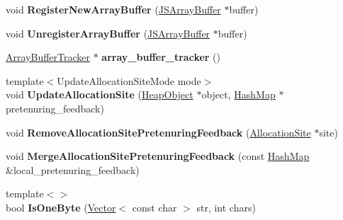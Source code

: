 \begin{DoxyCompactItemize}
\item 
void {\bfseries Register\+New\+Array\+Buffer} (\hyperlink{classv8_1_1internal_1_1_j_s_array_buffer}{J\+S\+Array\+Buffer} $\ast$buffer)\hypertarget{classv8_1_1internal_1_1_heap_a3afbaf3c1cf5f279c1fab793ba1d54df}{}\label{classv8_1_1internal_1_1_heap_a3afbaf3c1cf5f279c1fab793ba1d54df}

\item 
void {\bfseries Unregister\+Array\+Buffer} (\hyperlink{classv8_1_1internal_1_1_j_s_array_buffer}{J\+S\+Array\+Buffer} $\ast$buffer)\hypertarget{classv8_1_1internal_1_1_heap_a7c0fb6114ed2ace6d6064bb9e92ac0fd}{}\label{classv8_1_1internal_1_1_heap_a7c0fb6114ed2ace6d6064bb9e92ac0fd}

\item 
\hyperlink{classv8_1_1internal_1_1_array_buffer_tracker}{Array\+Buffer\+Tracker} $\ast$ {\bfseries array\+\_\+buffer\+\_\+tracker} ()\hypertarget{classv8_1_1internal_1_1_heap_a4594f7a6af31b366ffd6ea95f6cba410}{}\label{classv8_1_1internal_1_1_heap_a4594f7a6af31b366ffd6ea95f6cba410}

\item 
{\footnotesize template$<$Update\+Allocation\+Site\+Mode mode$>$ }\\void {\bfseries Update\+Allocation\+Site} (\hyperlink{classv8_1_1internal_1_1_heap_object}{Heap\+Object} $\ast$object, \hyperlink{classv8_1_1internal_1_1_template_hash_map_impl}{Hash\+Map} $\ast$pretenuring\+\_\+feedback)\hypertarget{classv8_1_1internal_1_1_heap_a987c6d6cc01906b8ede9f6b3770644ec}{}\label{classv8_1_1internal_1_1_heap_a987c6d6cc01906b8ede9f6b3770644ec}

\item 
void {\bfseries Remove\+Allocation\+Site\+Pretenuring\+Feedback} (\hyperlink{classv8_1_1internal_1_1_allocation_site}{Allocation\+Site} $\ast$site)\hypertarget{classv8_1_1internal_1_1_heap_aee1c7b64fe21e8721728f1b8cf0d8da5}{}\label{classv8_1_1internal_1_1_heap_aee1c7b64fe21e8721728f1b8cf0d8da5}

\item 
void {\bfseries Merge\+Allocation\+Site\+Pretenuring\+Feedback} (const \hyperlink{classv8_1_1internal_1_1_template_hash_map_impl}{Hash\+Map} \&local\+\_\+pretenuring\+\_\+feedback)\hypertarget{classv8_1_1internal_1_1_heap_a3589160dc5cad4ccc66caded12ac6026}{}\label{classv8_1_1internal_1_1_heap_a3589160dc5cad4ccc66caded12ac6026}

\item 
{\footnotesize template$<$$>$ }\\bool {\bfseries Is\+One\+Byte} (\hyperlink{classv8_1_1internal_1_1_vector}{Vector}$<$ const char $>$ str, int chars)\hypertarget{classv8_1_1internal_1_1_heap_a48a094941839f9ce22263b0a88bf3cb8}{}\label{classv8_1_1internal_1_1_heap_a48a094941839f9ce22263b0a88bf3cb8}


\end{DoxyCompactItemize}
